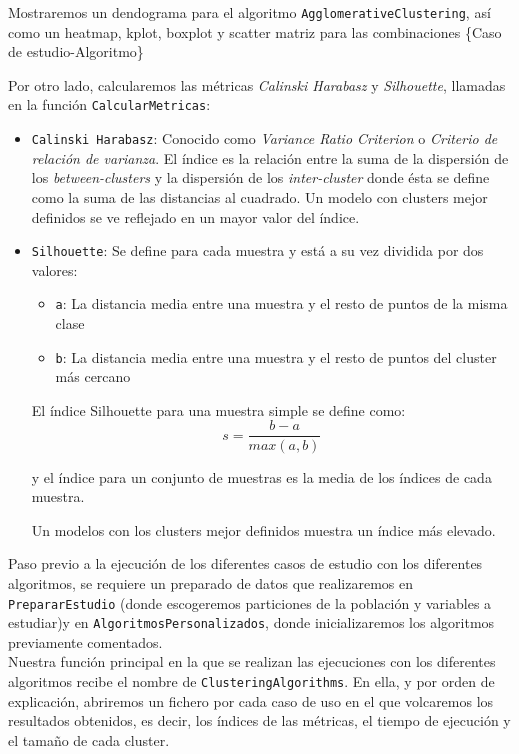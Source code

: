 	Mostraremos un dendograma para el algoritmo \texttt{AgglomerativeClustering}, así como un heatmap, kplot, boxplot y scatter matriz para las combinaciones \{Caso de estudio-Algoritmo\}	
	
	
	
	Por otro lado, calcularemos las métricas \textit{Calinski Harabasz} y \textit{Silhouette}, llamadas en la función \texttt{CalcularMetricas}:
	
	\begin{itemize}
		\item \texttt{Calinski Harabasz}: Conocido como \textit{Variance Ratio Criterion} o \textit{Criterio de relación de varianza}. 
		El índice es la relación entre la suma de
		la dispersión de los \textit{between-clusters} y la dispersión de los \textit{inter-cluster} donde ésta se define como la suma de las distancias al cuadrado.
		Un modelo con clusters mejor definidos se ve reflejado en un mayor valor del índice.
		
		\item \texttt{Silhouette}:
		Se define para cada muestra y está a su vez dividida por dos valores:
		\begin{itemize}
			\item \texttt{a}: La distancia media entre una muestra y el resto de puntos de la misma clase
			\item \texttt{b}: La distancia media entre una muestra y el resto de puntos del cluster más cercano
		\end{itemize}
	
		El índice Silhouette para una muestra simple se define como:
		\begin{equation}
			s = \frac{b-a}{max(a,b)}
		\end{equation}
		
		y el índice para un conjunto de muestras es la media de los índices de cada muestra.
		
		Un modelos con los clusters mejor definidos muestra un índice más elevado.
	\end{itemize}


	Paso previo a la ejecución de los diferentes casos de estudio con los diferentes algoritmos, se requiere un preparado de datos que realizaremos en \texttt{PrepararEstudio} (donde escogeremos particiones de la población y variables a estudiar)y en  \texttt{AlgoritmosPersonalizados}, donde inicializaremos los algoritmos previamente comentados. \\ 
	
	Nuestra función principal en la que se realizan las ejecuciones con los diferentes algoritmos recibe el nombre de \texttt{ClusteringAlgorithms}. En ella, y por orden de explicación, abriremos un fichero por cada caso de uso en el que volcaremos los resultados obtenidos, es decir, los índices de las métricas, el tiempo de ejecución y el tamaño de cada cluster. 
	
